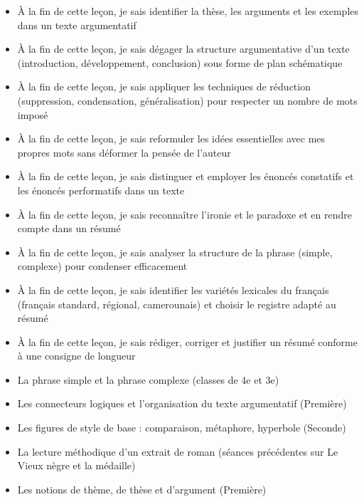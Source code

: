\documentclass[11pt]{article}
\begin{document}
\begin{objectifs}
\begin{itemize}
\item À la fin de cette leçon, je sais identifier la thèse, les arguments et les exemples dans un texte argumentatif
\item À la fin de cette leçon, je sais dégager la structure argumentative d'un texte (introduction, développement, conclusion) sous forme de plan schématique
\item À la fin de cette leçon, je sais appliquer les techniques de réduction (suppression, condensation, généralisation) pour respecter un nombre de mots imposé
\item À la fin de cette leçon, je sais reformuler les idées essentielles avec mes propres mots sans déformer la pensée de l'auteur
\item À la fin de cette leçon, je sais distinguer et employer les énoncés constatifs et les énoncés performatifs dans un texte
\item À la fin de cette leçon, je sais reconnaître l'ironie et le paradoxe et en rendre compte dans un résumé
\item À la fin de cette leçon, je sais analyser la structure de la phrase (simple, complexe) pour condenser efficacement
\item À la fin de cette leçon, je sais identifier les variétés lexicales du français (français standard, régional, camerounais) et choisir le registre adapté au résumé
\item À la fin de cette leçon, je sais rédiger, corriger et justifier un résumé conforme à une consigne de longueur
\end{itemize}
\end{objectifs}

\begin{prerequis}
\begin{itemize}
\item La phrase simple et la phrase complexe (classes de 4e et 3e)
\item Les connecteurs logiques et l'organisation du texte argumentatif (Première)
\item Les figures de style de base : comparaison, métaphore, hyperbole (Seconde)
\item La lecture méthodique d'un extrait de roman (séances précédentes sur Le Vieux nègre et la médaille)
\item Les notions de thème, de thèse et d'argument (Première)
\end{itemize}
\end{prerequis}
\end{document}
